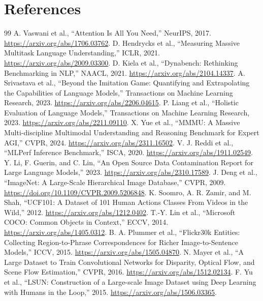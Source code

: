 ﻿\documentclass[11pt,a4paper]{article}
\begin{document}
\section{References}
\begin{thebibliography}{99}
 A. Vaswani et al., ``Attention Is All You Need,'' NeurIPS, 2017. \url{https://arxiv.org/abs/1706.03762}.
 D. Hendrycks et al., ``Measuring Massive Multitask Language Understanding,'' ICLR, 2021. \url{https://arxiv.org/abs/2009.03300}.
 D. Kiela et al., ``Dynabench: Rethinking Benchmarking in NLP,'' NAACL, 2021. \url{https://arxiv.org/abs/2104.14337}.
 A. Srivastava et al., ``Beyond the Imitation Game: Quantifying and Extrapolating the Capabilities of Language Models,'' Transactions on Machine Learning Research, 2023. \url{https://arxiv.org/abs/2206.04615}.
 P. Liang et al., ``Holistic Evaluation of Language Models,'' Transactions on Machine Learning Research, 2023. \url{https://arxiv.org/abs/2211.09110}.
 X. Yue et al., ``MMMU: A Massive Multi-discipline Multimodal Understanding and Reasoning Benchmark for Expert AGI,'' CVPR, 2024. \url{https://arxiv.org/abs/2311.16502}.
 V. J. Reddi et al., ``MLPerf Inference Benchmark,'' ISCA, 2020. \url{https://arxiv.org/abs/1911.02549}.
 Y. Li, F. Guerin, and C. Lin, ``An Open Source Data Contamination Report for Large Language Models,'' 2023. \url{https://arxiv.org/abs/2310.17589}.
 J. Deng et al., ``ImageNet: A Large-Scale Hierarchical Image Database,'' CVPR, 2009. \url{https://doi.org/10.1109/CVPR.2009.5206848}.
 K. Soomro, A. R. Zamir, and M. Shah, ``UCF101: A Dataset of 101 Human Actions Classes From Videos in the Wild,'' 2012. \url{https://arxiv.org/abs/1212.0402}.
 T.-Y. Lin et al., ``Microsoft COCO: Common Objects in Context,'' ECCV, 2014. \url{https://arxiv.org/abs/1405.0312}.
 B. A. Plummer et al., ``Flickr30k Entities: Collecting Region-to-Phrase Correspondences for Richer Image-to-Sentence Models,'' ICCV, 2015. \url{https://arxiv.org/abs/1505.04870}.
 N. Mayer et al., ``A Large Dataset to Train Convolutional Networks for Disparity, Optical Flow, and Scene Flow Estimation,'' CVPR, 2016. \url{https://arxiv.org/abs/1512.02134}.
 F. Yu et al., ``LSUN: Construction of a Large-scale Image Dataset using Deep Learning with Humans in the Loop,'' 2015. \url{https://arxiv.org/abs/1506.03365}.

\end{thebibliography}
\end{document}
